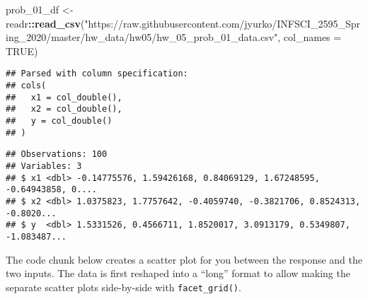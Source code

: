 \documentclass[
]{article}
\newenvironment{Shaded}{\begin{snugshade}}{\end{snugshade}}
\newcommand{\DataTypeTok}[1]{\textcolor[rgb]{0.13,0.29,0.53}{#1}}
\newcommand{\DecValTok}[1]{\textcolor[rgb]{0.00,0.00,0.81}{#1}}
\newcommand{\KeywordTok}[1]{\textcolor[rgb]{0.13,0.29,0.53}{\textbf{#1}}}
\newcommand{\NormalTok}[1]{#1}
\newcommand{\OperatorTok}[1]{\textcolor[rgb]{0.81,0.36,0.00}{\textbf{#1}}}
\newcommand{\OtherTok}[1]{\textcolor[rgb]{0.56,0.35,0.01}{#1}}
\newcommand{\StringTok}[1]{\textcolor[rgb]{0.31,0.60,0.02}{#1}}
\begin{document}
\begin{Shaded}
\begin{Highlighting}[]
\NormalTok{prob_}\DecValTok{01}\NormalTok{_df <-}\StringTok{ }\NormalTok{readr}\OperatorTok{::}\KeywordTok{read_csv}\NormalTok{(}\StringTok{"https://raw.githubusercontent.com/jyurko/INFSCI_2595_Spring_2020/master/hw_data/hw05/hw_05_prob_01_data.csv"}\NormalTok{, }\DataTypeTok{col_names =} \OtherTok{TRUE}\NormalTok{)}
\end{Highlighting}
\end{Shaded}

\begin{verbatim}
## Parsed with column specification:
## cols(
##   x1 = col_double(),
##   x2 = col_double(),
##   y = col_double()
## )
\end{verbatim}

\begin{Shaded}
\end{Shaded}

\begin{verbatim}
## Observations: 100
## Variables: 3
## $ x1 <dbl> -0.14775576, 1.59426168, 0.84069129, 1.67248595, -0.64943858, 0....
## $ x2 <dbl> 1.0375823, 1.7757642, -0.4059740, -0.3821706, 0.8524313, -0.8020...
## $ y  <dbl> 1.5331526, 0.4566711, 1.8520017, 3.0913179, 0.5349807, -1.083487...
\end{verbatim}

The code chunk below creates a scatter plot for you between the response
and the two inputs. The data is first reshaped into a ``long'' format to
allow making the separate scatter plots side-by-side with
\texttt{facet\_grid()}.

\begin{Shaded}
\end{Shaded}
\end{document}
